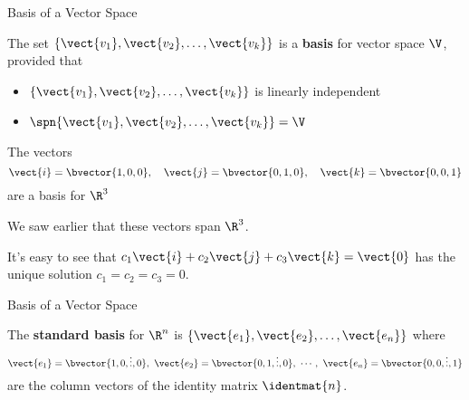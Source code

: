 \documentclass{beamer}
\begin{document}
\begin{frame}{Basis of a Vector Space}
\begin{definition}
The set $\{\vect{v_1},\vect{v_2},\ldots,\vect{v_k}\}$ is a \textbf{basis} for vector space $\V$, provided that
\begin{itemize}
\item $\{\vect{v_1},\vect{v_2},\ldots,\vect{v_k}\}$ is linearly independent
\item $\spn\{\vect{v_1},\vect{v_2},\ldots,\vect{v_k}\}=\V$
\end{itemize}
\end{definition}\pause
\begin{example}
The vectors
\begin{equation*}
\vect{i}=\bvector{1,0,0},\quad
\vect{j}=\bvector{0,1,0},\quad
\vect{k}=\bvector{0,0,1}
\end{equation*}
are a basis for $\R^3$\pause

We saw earlier that these vectors span $\R^3$.\pause

It's easy to see that $c_1\vect{i}+c_2\vect{j}+c_3\vect{k}=\vect{0}$ has the unique solution $c_1=c_2=c_3=0$.
\end{example}
\end{frame}

\begin{frame}{Basis of a Vector Space}
\begin{definition}
The \textbf{standard basis} for $\R^n$ is $\{\vect{e_1},\vect{e_2},\dots,\vect{e_n}\}$
where
\begin{equation*}
\vect{e_1}=\bvector{1,0,\vdots,0},\ 
\vect{e_2}=\bvector{0,1,\vdots,0},\ 
\cdots,\ 
\vect{e_n}=\bvector{0,0,\vdots,1}
\end{equation*}
are the column vectors of the identity matrix $\identmat{n}$.
\end{definition}
\end{frame}
\end{document}
